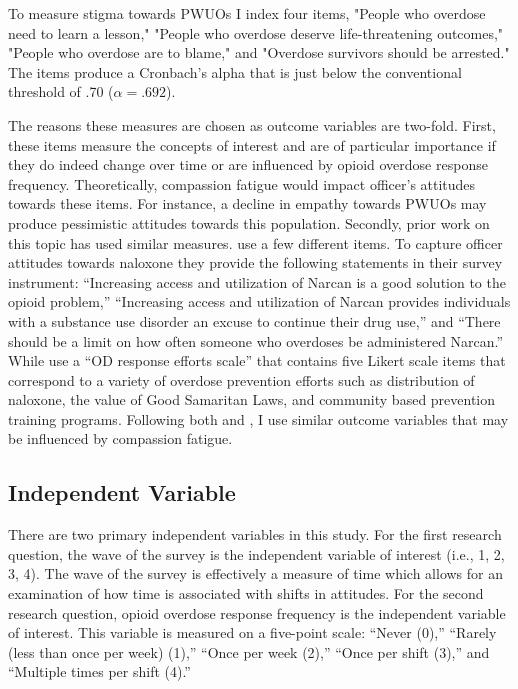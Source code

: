 To measure stigma towards PWUOs I index four items, "People who overdose need to learn a lesson," "People who overdose deserve life-threatening outcomes," "People who overdose are to blame," and "Overdose survivors should be arrested." The items produce a Cronbach's alpha that is just below the conventional threshold of .70 (\(\alpha = .692\)).

The reasons these measures are chosen as outcome variables are two-fold. First, these items measure the concepts of interest and are of particular importance if they do indeed change over time or are influenced by opioid overdose response frequency. Theoretically, compassion fatigue would impact officer's attitudes towards these items. For instance, a decline in empathy towards PWUOs may produce pessimistic attitudes towards this population. Secondly, prior work on this topic has used similar measures. \textcite{murphy_police_2020} use a few different items. To capture officer attitudes towards naloxone they provide the following statements in their survey instrument: “Increasing access and utilization of Narcan is a good solution to the opioid problem,” “Increasing access and utilization of Narcan provides individuals with a substance use disorder an excuse to continue their drug use,” and “There should be a limit on how often someone who overdoses be administered Narcan.” While \textcite{carroll_knowledge_2020} use a “OD response efforts scale” that contains five Likert scale items that correspond to a variety of overdose prevention efforts such as distribution of naloxone, the value of Good Samaritan Laws, and community based prevention training programs. Following both \textcite{murphy_police_2020} and \textcite{carroll_knowledge_2020}, I use similar outcome variables that may be influenced by compassion fatigue. 

\subsection{Independent Variable}

There are two primary independent variables in this study. For the first research question, the wave of the survey is the independent variable of interest (i.e., 1, 2, 3, 4). The wave of the survey is effectively a measure of time which allows for an examination of how time is associated with shifts in attitudes. For the second research question, opioid overdose response frequency is the independent variable of interest. This variable is measured on a five-point scale: “Never (0),” “Rarely (less than once per week) (1),” “Once per week (2),” “Once per shift (3),” and “Multiple times per shift (4).”

